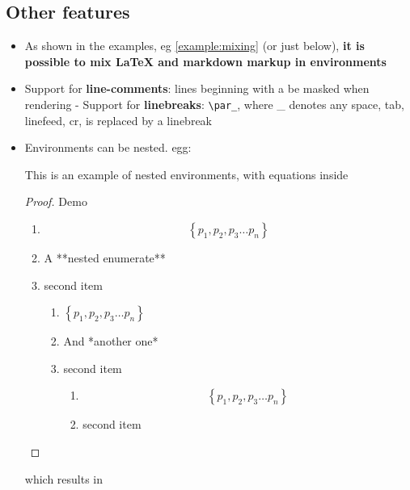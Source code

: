     \subsection{Other features}\label{other-features}

    \begin{itemize}
\item
  As shown in the examples, eg \ref{example:mixing} (or just below),
  \textbf{it is possible to mix LaTeX and markdown markup in
  environments}
\item
  Support for \textbf{line-comments}: lines beginning with a %
  be masked when rendering 
- Support for \textbf{linebreaks}:
  \texttt{\textbackslash{}par\_}, where \_ denotes any space, tab,
  linefeed, cr, is replaced by a linebreak
\item
  Environments can be nested. egg:

  \begin{listing}
  This is an example of nested environments, with equations inside\\
  \begin{proof} Demo
\begin{enumerate}
  \item $$ \left\{ p_1, p_2, p_3 \ldots p_n \right\} $$
  \item A **nested enumerate**
  \item second item 
  \begin{enumerate}
  \item $ \left\{ p_1, p_2, p_3 \ldots p_n \right\} $
  \item And *another one*
  \item second item 
  \begin{enumerate}
  \item $$ \left\{ p_1, p_2, p_3 \ldots p_n \right\} $$
  \item second item 
  \end{enumerate}
  \end{enumerate}
  \end{enumerate}
  \end{proof}
  \end{listing}

  which results in
\end{itemize}

